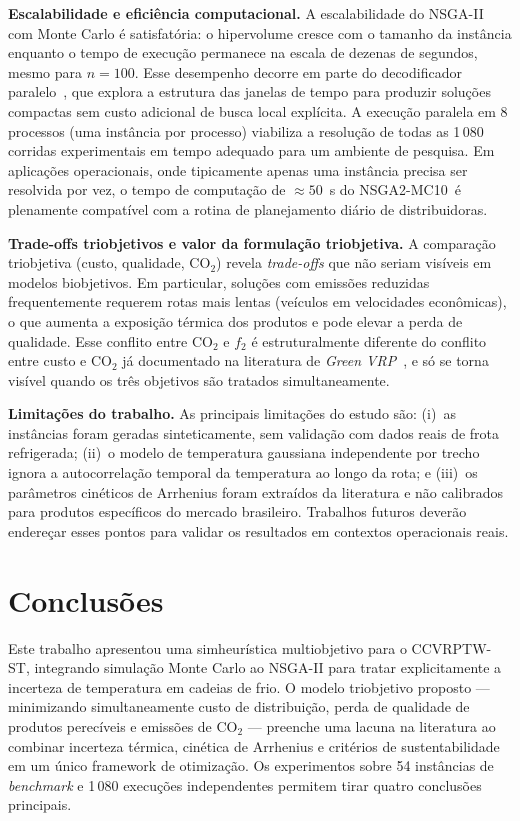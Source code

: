 \documentclass[a4paper,11pt]{article}
\newcommand{\nsmx}{NSGA2\mbox{-}MC10\xspace}
\begin{document}
\textbf{Escalabilidade e efici\^encia computacional.}
A escalabilidade do NSGA-II com Monte Carlo é satisfatória:
o hipervolume cresce com o tamanho da inst\^ancia enquanto o tempo de execução
permanece na escala de dezenas de segundos, mesmo para $n=100$.
Esse desempenho decorre em parte do decodificador paralelo~\citep{nagata:2009},
que explora a estrutura das janelas de tempo para produzir soluções compactas
sem custo adicional de busca local explícita.
A execução paralela em 8 processos (uma inst\^ancia por processo) viabiliza
a resolução de todas as 1\,080 corridas experimentais em tempo adequado
para um ambiente de pesquisa.
Em aplicações operacionais, onde tipicamente apenas uma inst\^ancia precisa
ser resolvida por vez, o tempo de computação de $\approx50$~s do \nsmx~é
plenamente compatível com a rotina de planejamento diário de distribuidoras.

\textbf{Trade-offs triobjetivos e valor da formulação triobjetiva.}
A comparação triobjetiva (custo, qualidade, CO$_2$) revela
\textit{trade-offs} que não seriam visíveis em modelos biobjetivos.
Em particular, soluções com emissões reduzidas frequentemente
requerem rotas mais lentas (veículos em velocidades econ\^omicas),
o que aumenta a exposição térmica dos produtos e pode elevar a perda
de qualidade.
Esse conflito entre CO$_2$ e $f_2$ é estruturalmente diferente do conflito
entre custo e CO$_2$ já documentado na literatura de \textit{Green VRP}~\citep{demir:2014},
e só se torna visível quando os tr\^es objetivos são tratados simultaneamente.

\textbf{Limitações do trabalho.}
As principais limitações do estudo são: (i)~as inst\^ancias foram geradas
sinteticamente, sem validação com dados reais de frota refrigerada;
(ii)~o modelo de temperatura gaussiana independente por trecho ignora
a autocorrelação temporal da temperatura ao longo da rota;
e (iii)~os par\^ametros cinéticos de Arrhenius foram extraídos da
literatura e não calibrados para produtos específicos do mercado brasileiro.
Trabalhos futuros deverão endereçar esses pontos para validar os resultados
em contextos operacionais reais.

\section{Conclusões}

Este trabalho apresentou uma simheurística multiobjetivo para o CCVRPTW-ST,
integrando simulação Monte Carlo ao NSGA-II para tratar explicitamente a
incerteza de temperatura em cadeias de frio.
O modelo triobjetivo proposto --- minimizando simultaneamente custo de
distribuição, perda de qualidade de produtos perecíveis e emissões
de CO$_2$ --- preenche uma lacuna na literatura ao combinar incerteza
térmica, cinética de Arrhenius e critérios de sustentabilidade
em um único framework de otimização.
Os experimentos sobre 54 inst\^ancias de \textit{benchmark} e 1\,080 execuções
independentes permitem tirar quatro conclusões principais.
\end{document}
